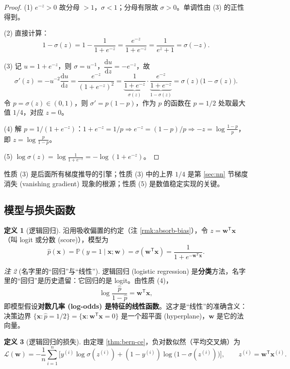\documentclass[UTF8,a4paper,11pt]{ctexart}
\theoremstyle{definition}
\newtheorem{definition}{定义}[section]
\theoremstyle{plain}
\theoremstyle{remark}
\newtheorem{remark}[definition]{注}
\newcommand{\Prob}{\mathbb{P}}
\newcommand{\Loss}{\mathcal{L}}
\newcommand{\dd}{\mathrm{d}}
\newcommand{\T}{^{\mathsf{T}}}
\newcommand{\eng}[1]{\textup{(#1)}}
\begin{document}
\begin{proof}
(1) $e^{-z}>0$ 故分母 $>1$，$\sigma<1$；分母有限故 $\sigma>0$。单调性由 (3) 的正性得到。

(2) 直接计算：
\[
  1-\sigma(z)=1-\frac{1}{1+e^{-z}}=\frac{e^{-z}}{1+e^{-z}}
  =\frac{1}{e^{z}+1}=\sigma(-z).
\]

(3) 记 $u=1+e^{-z}$，则 $\sigma=u^{-1}$，$\dfrac{\dd u}{\dd z}=-e^{-z}$，故
\[
  \sigma'(z)=-u^{-2}\frac{\dd u}{\dd z}=\frac{e^{-z}}{(1+e^{-z})^2}
  =\underbrace{\frac{1}{1+e^{-z}}}_{\sigma(z)}\cdot\underbrace{\frac{e^{-z}}{1+e^{-z}}}_{1-\sigma(z)}
  =\sigma(z)\big(1-\sigma(z)\big).
\]
令 $p=\sigma(z)\in(0,1)$，则 $\sigma'=p(1-p)$，作为 $p$ 的函数在 $p=1/2$ 处取最大值 $1/4$，对应 $z=0$。

(4) 解 $p=1/(1+e^{-z})$：$1+e^{-z}=1/p\Rightarrow e^{-z}=(1-p)/p\Rightarrow -z=\log\frac{1-p}{p}$，即 $z=\log\frac{p}{1-p}$。

(5) $\log\sigma(z)=\log\frac{1}{1+e^{-z}}=-\log(1+e^{-z})$。
\end{proof}

性质 (3) 是后面所有梯度推导的引擎；性质 (3) 中的上界 $1/4$ 是第 \ref{sec:nn} 节梯度消失 \eng{vanishing gradient} 现象的根源；性质 (5) 是数值稳定实现的关键。

\subsection{模型与损失函数}

\begin{definition}[逻辑回归]\label{def:logreg}
沿用吸收偏置的约定（注 \ref{rmk:absorb-bias}），令 $z=\bm{w}\T\bm{x}$（叫 logit 或分数 \eng{score}），模型为
\begin{equation}\label{eq:logreg}
  \hat p(\bm{x})=\Prob(y=1\mid\bm{x};\bm{w})=\sigma(\bm{w}\T\bm{x})=\frac{1}{1+e^{-\bm{w}\T\bm{x}}} .
\end{equation}
\end{definition}

\begin{remark}[名字里的“回归”与“线性”]
逻辑回归 \eng{logistic regression} 是\textbf{分类}方法，名字里的“回归”是历史遗留：它回归的是 logit。由性质 (4)，
\[
  \log\frac{\hat p}{1-\hat p}=\bm{w}\T\bm{x},
\]
即模型假设\textbf{对数几率 \eng{log-odds} 是特征的线性函数}。这才是“线性”的准确含义：决策边界 $\{\bm{x}:\hat p=1/2\}=\{\bm{x}:\bm{w}\T\bm{x}=0\}$ 是一个超平面 \eng{hyperplane}，$\bm{w}$ 是它的法向量。
\end{remark}

\begin{definition}[逻辑回归的损失]\label{def:logreg-loss}
由定理 \ref{thm:bern-ce}，负对数似然（平均交叉熵）为
\begin{equation}\label{eq:logreg-loss}
  \Loss(\bm{w})=-\frac1n\sum_{i=1}^{n}\Big[y^{(i)}\log\sigma(z^{(i)})+(1-y^{(i)})\log\big(1-\sigma(z^{(i)})\big)\Big],
  \qquad z^{(i)}=\bm{w}\T\bm{x}^{(i)} .
\end{equation}
\end{definition}
\end{document}
